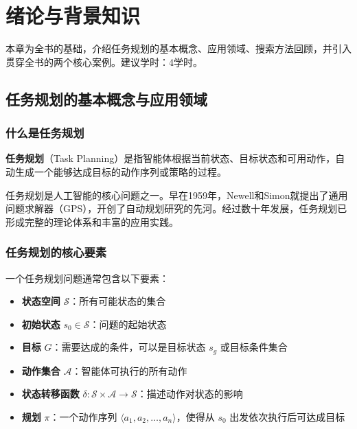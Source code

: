 \chapter{绪论与背景知识}

\begin{levelbox}
本章为全书的基础，介绍任务规划的基本概念、应用领域、搜索方法回顾，并引入贯穿全书的两个核心案例。建议学时：4学时。
\end{levelbox}

\section{任务规划的基本概念与应用领域}

\subsection{什么是任务规划}

\begin{definition}[任务规划]
\textbf{任务规划}（Task Planning）是指智能体根据当前状态、目标状态和可用动作，自动生成一个能够达成目标的动作序列或策略的过程。
\end{definition}

任务规划是人工智能的核心问题之一。早在1959年，Newell和Simon就提出了通用问题求解器（GPS），开创了自动规划研究的先河。经过数十年发展，任务规划已形成完整的理论体系和丰富的应用实践。

\subsection{任务规划的核心要素}

一个任务规划问题通常包含以下要素：

\begin{itemize}[leftmargin=2em]
  \item \textbf{状态空间} $\mathcal{S}$：所有可能状态的集合
  \item \textbf{初始状态} $s_0 \in \mathcal{S}$：问题的起始状态
  \item \textbf{目标} $G$：需要达成的条件，可以是目标状态 $s_g$ 或目标条件集合
  \item \textbf{动作集合} $\mathcal{A}$：智能体可执行的所有动作
  \item \textbf{状态转移函数} $\delta: \mathcal{S} \times \mathcal{A} \rightarrow \mathcal{S}$：描述动作对状态的影响
  \item \textbf{规划} $\pi$：一个动作序列 $\langle a_1, a_2, \ldots, a_n \rangle$，使得从 $s_0$ 出发依次执行后可达成目标
\end{itemize}

